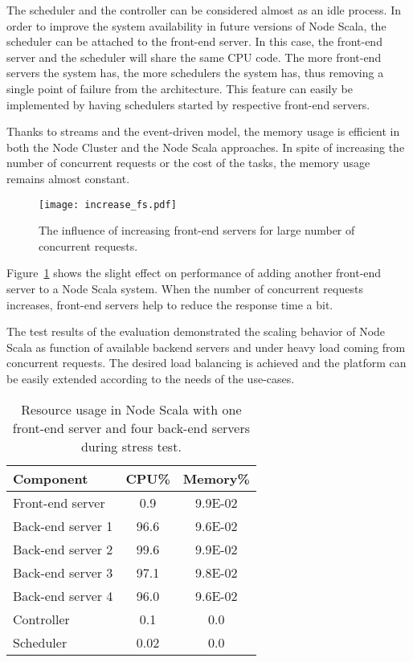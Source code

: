 \documentclass[10pt,conference,letterpaper]{IEEEtran}
\begin{document}
The scheduler and the controller can be considered almost as an idle
process. In order to improve the system availability in future
versions of Node Scala, the scheduler can be attached to the front-end
server. In this case, the front-end server and the scheduler will
share the same CPU code. The more front-end servers the system has,
the more schedulers the system has, thus removing a single point of
failure from the architecture. This feature can easily be implemented
by having schedulers started by respective front-end servers.

Thanks to streams and the event-driven model, the memory usage is
efficient in both the Node Cluster and the Node Scala approaches. In
spite of increasing the number of concurrent requests or the cost of
the tasks, the memory usage remains almost constant.

\begin{figure}
  \centering
    \texttt{[image: increase\_fs.pdf]}
  \caption{The influence of increasing front-end servers for large number of concurrent requests.}
  \label{fig:increase_fs}
\end{figure}

Figure~\ref{fig:increase_fs} shows the slight effect on performance of
adding another front-end server to a Node Scala system. When the
number of concurrent requests increases, front-end servers help to
reduce the response time a bit.

The test results of the evaluation demonstrated the scaling behavior of Node Scala as function of available backend servers and under heavy load coming from concurrent requests. The desired load balancing is achieved and the platform can be easily extended according to the needs of the use-cases.

\begin{table}
  \centering
  \caption{Resource usage in Node Scala with one front-end server and four back-end servers during stress test.}
  \label{tab:scala_resources}
    \begin{tabular}{|l|c|c|}
      \hline
      \textbf{Component} & \textbf{CPU\%} & \textbf{Memory\%} \\
      \hline
      Front-end server  & 0.9 & 9.9E-02 \\
      \hline
      Back-end server 1 & 96.6 & 9.6E-02 \\
      \hline
      Back-end server 2 & 99.6 & 9.9E-02 \\
      \hline
      Back-end server 3 & 97.1 & 9.8E-02 \\
      \hline
      Back-end server 4 & 96.0 & 9.6E-02 \\
      \hline
      Controller & 0.1 & 0.0 \\
      \hline
      Scheduler & 0.02 & 0.0 \\
      \hline
    \end{tabular}
\end{table}
\end{document}
